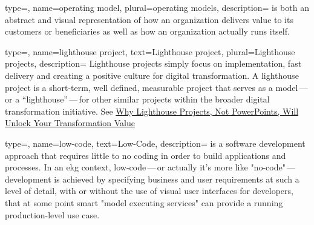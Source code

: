 



 {
    type=\glsdefaulttype,
    name={operating model},
    plural={operating models},
    description={%
        is both an abstract and visual representation of how an organization delivers value to its customers or
        beneficiaries as well as how an organization actually runs itself.
    }
}

 {
    type=\glsdefaulttype,
    name={lighthouse project},
    text={Lighthouse project},
    plural={Lighthouse projects},
    description={%
        Lighthouse projects simply focus on implementation, fast delivery and creating a positive culture for
        digital transformation.
        A lighthouse project is a short-term, well defined, measurable project that serves as a model\,---\,or
        a “lighthouse”\,---\,for other similar projects within the broader digital transformation initiative.
        See \href{https://www.contino.io/insights/why-lighthouse-projects-not-powerpoints-will-unlock-your-transformation-value}
        {Why Lighthouse Projects, Not PowerPoints, Will Unlock Your Transformation Value}
    }
}

 {
    type=\glsdefaulttype,
    name={low-code},
    text={Low-Code},
    description={%
        is a software development approach that requires little to no coding in order to build applications and processes.
        In an \gls{ekg} context, low-code\,---\,or actually it's more like "no-code"\,---\,development is achieved by
        specifying business and user requirements at such a level of detail, with or without the use of
        visual user interfaces for developers, that at some point smart "model executing services" can provide a running
        production-level use case.
    }
}
